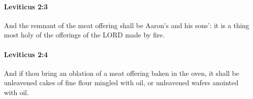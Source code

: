 		\paragraph{Leviticus 2:3} %
			\label{LEVITICUS-2-3}

			And the remnant of the meat offering shall be Aaron’s and his sons’: it is a thing most holy of the offerings of the LORD made by fire.


		\paragraph{Leviticus 2:4} %
			\label{LEVITICUS-2-4}

			And if thou bring an oblation of a meat offering baken in the oven, it shall be unleavened cakes of fine flour mingled with oil, or unleavened wafers anointed with oil.


